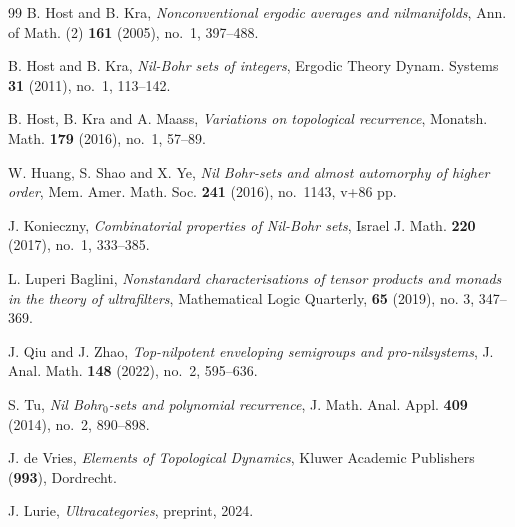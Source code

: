 \documentclass[11pt]{amsart}
\theoremstyle{definition}
\theoremstyle{remark}
\begin{document}
\begin{thebibliography}{99}
B. Host and B. Kra,
\emph{Nonconventional ergodic averages and nilmanifolds},
Ann. of Math. (2) \textbf{161} (2005), no.~1, 397--488.

B. Host and B. Kra,
\emph{Nil-Bohr sets of integers},
Ergodic Theory Dynam. Systems \textbf{31} (2011), no.~1, 113--142.


B. Host, B. Kra and A. Maass,
\emph{Variations on topological recurrence},
Monatsh. Math. \textbf{179} (2016), no.~1, 57--89.

W. Huang, S. Shao and X. Ye,
\emph{Nil Bohr-sets and almost automorphy of higher order},
Mem. Amer. Math. Soc. \textbf{241} (2016), no.~1143, v+86 pp.



J. Konieczny,
\emph{Combinatorial properties of Nil-Bohr sets},
Israel J. Math. \textbf{220} (2017), no.~1, 333--385.

L. Luperi Baglini, \emph{Nonstandard characterisations of tensor products and monads in the theory of ultrafilters}, Mathematical Logic Quarterly, \textbf{65} (2019), no. 3, 347–369.

J. Qiu and J. Zhao,
\emph{Top-nilpotent enveloping semigroups and pro-nilsystems},
J. Anal. Math. \textbf{148} (2022), no.~2, 595--636.

S. Tu,
\emph{Nil Bohr$_0$-sets and polynomial recurrence},
J. Math. Anal. Appl. \textbf{409} (2014), no.~2, 890--898.

J. de Vries, \emph{Elements of Topological Dynamics}, Kluwer Academic Publishers (\textbf{993}), Dordrecht.






J. Lurie, \emph{Ultracategories}, preprint, 2024.
 

\end{thebibliography}
\end{document}
